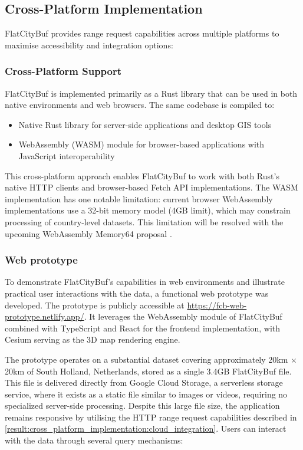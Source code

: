 \subsection{Cross-Platform Implementation}
\label{result:cross_platform_implementation}

FlatCityBuf provides range request capabilities across multiple platforms to maximise accessibility and integration options:
\subsubsection{Cross-Platform Support}
\label{result:cross_platform_implementation:cross_platform}

FlatCityBuf is implemented primarily as a Rust library that can be used in both native environments and web browsers. The same codebase is compiled to:

\begin{itemize}
  \item Native Rust library for server-side applications and desktop GIS tools
  \item WebAssembly (WASM) module for browser-based applications with JavaScript interoperability
\end{itemize}

This cross-platform approach enables FlatCityBuf to work with both Rust's native HTTP clients and browser-based Fetch API implementations. The WASM implementation has one notable limitation: current browser WebAssembly implementations use a 32-bit memory model (4GB limit), which may constrain processing of country-level datasets. This limitation will be resolved with the upcoming WebAssembly Memory64 proposal \citep{WebAssemblyCoreSpecification2}.
\subsubsection{Web prototype}
\label{result:cross_platform_implementation:web_prototype}

To demonstrate FlatCityBuf's capabilities in web environments and illustrate practical user interactions with the data, a functional web prototype was developed. The prototype is publicly accessible at \url{https://fcb-web-prototype.netlify.app/}. It leverages the WebAssembly module of FlatCityBuf combined with TypeScript and React for the frontend implementation, with Cesium serving as the 3D map rendering engine.

The prototype operates on a substantial dataset covering approximately 20km $\times$ 20km of South Holland, Netherlands, stored as a single 3.4GB FlatCityBuf file. This file is delivered directly from Google Cloud Storage\citep{gcs}, a serverless storage service, where it exists as a static file similar to images or videos, requiring no specialized server-side processing. Despite this large file size, the application remains responsive by utilising the HTTP range request capabilities described in \autoref{result:cross_platform_implementation:cloud_integration}. Users can interact with the data through several query mechanisms:

